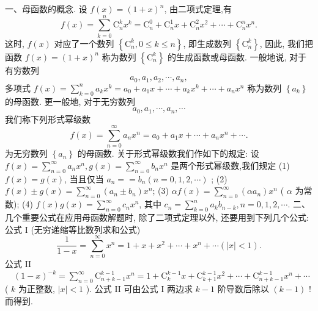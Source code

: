
一、母函数的概念.
设 $f(x)=(1+x)^n$, 由二项式定理,有
$$
f(x)=\sum_{k=0}^n \mathrm{C}_n^k x^k=\mathrm{C}_n^0+\mathrm{C}_n^1 x+\mathrm{C}_n^2 x^2+\cdots+\mathrm{C}_n^n x^n .
$$
这时, $f(x)$ 对应了一个数列 $\left\{\mathrm{C}_n^k, 0 \leqslant k \leqslant n\right\}$, 即生成数列 $\left\{\mathrm{C}_n^k\right\}$, 因此, 我们把函数 $f(x)=(1+x)^n$ 称为数列 $\left\{\mathrm{C}_n^k\right\}$ 的生成函数或母函数.
一般地说, 对于有穷数列
$$
a_0, a_1, a_2, \cdots, a_n,
$$
多项式 $f(x)=\sum_{k=0}^n a_k x^k=a_0+a_1 x+\cdots+a_k x^k+\cdots+a_n x^n$ 称为数列 $\left\{a_k\right\}$ 的母函数.
更一般地, 对于无穷数列
$$
a_0, a_1, \cdots, a_n, \cdots
$$
我们称下列形式幂级数
$$
f(x)=\sum_{n=0}^{\infty} a_n x^n=a_0+a_1 x+\cdots+a_n x^n+\cdots .
$$
为无穷数列 $\left\{a_n\right\}$ 的母函数.
关于形式幂级数我们作如下的规定: 设 $f(x)=\sum_{n=0}^{\infty} a_n x^n, g(x)= \sum_{n=0}^{\infty} b_n x^n$ 是两个形式幂级数,我们规定
(1) $f(x)=g(x)$, 当且仅当 $a_n==b_n(n=0,1,2, \cdots)$ ;
(2) $f(x) \pm g(x)=\sum_{n=0}^{\infty}\left(a_n \pm b_n\right) x^n$;
(3) $\alpha f(x)=\sum_{n=0}^{\infty}\left(\alpha a_n\right) x^n$ ( $\alpha$ 为常数);
(4) $f(x) g(x)=\sum_{n=0}^{\infty} c_n x^n$, 其中 $c_n=\sum_{k=0}^n a_k b_{n-k}, n=0,1,2, \cdots$.
二、几个重要公式在应用母函数解题时, 除了二项式定理以外, 还要用到下列几个公式: 公式 I (无穷递缩等比数列求和公式)
$$
\frac{1}{1-x}=\sum_{n=0}^{\infty} x^n=1+x+x^2+\cdots+x^n+\cdots(|x|<1) .
$$
公式 II $\quad(1-x)^{-k}=\sum_{n=0}^{\infty} \mathrm{C}_{n+k-1}^{k-1} x^n=1+\mathrm{C}_k^{k-1} x+\mathrm{C}_{k+1}^{k-1} x^2+\cdots+\mathrm{C}_{n+k-1}^{k-1} x^n+ \cdots$ ( $k$ 为正整数, $|x|<1$ ).
公式 II 可由公式 I 两边求 $k-1$ 阶导数后除以 $(k-1)$ ! 而得到.



